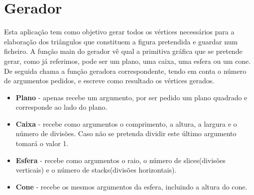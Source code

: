 \documentclass[12pt]{article}
\begin{document}
\section{Gerador}
Esta aplicação tem como objetivo gerar todos os vértices necessários para a elaboração dos triângulos que constituem a figura pretendida e guardar num ficheiro.
A função main do gerador vê qual a primitiva gráfica que se pretende gerar, como já referimos, pode ser um plano, uma caixa, uma esfera ou um cone.
De seguida chama a função geradora correspondente, tendo em conta o número de argumentos pedidos, e escreve como resultado os vértices gerados.\newline
\begin{center}
\end{center}
\begin{itemize}
\item\textbf{Plano} - apenas recebe um argumento, por ser pedido um plano quadrado e corresponde ao lado do plano. 
\item\textbf{Caixa} - recebe como argumentos o comprimento, a altura, a largura e o número de divisões. Caso não se pretenda dividir este último argumento tomará o valor 1.
\item\textbf{Esfera} - recebe como argumentos o raio, o número de slices(divisões verticais) e o número de stacks(divisões horizontais).
\item\textbf{Cone} - recebe os mesmos argumentos da esfera, incluindo a altura do cone.
\end{itemize}
\newpage
\end{document}
